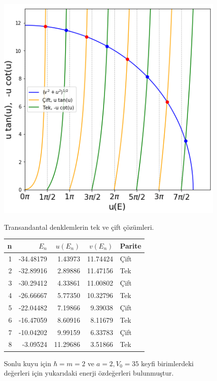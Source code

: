 \documentclass[a4paper,12pt, twoside]{article}
\begin{document}
\begin{figure}[!hbtp]
\begin{minipage}{.5\textwidth}
	\centering
	\includegraphics[width=\linewidth]{figurler/SonluKuyu_transandantal_cozumler.png}
	\caption{Transandantal denklemlerin tek ve çift çözümleri.}
	\label{fig:sonluKuyu_transandantal_cozumler}
\end{minipage}
\begin{minipage}{.5\textwidth}
\begin{tabular}{rrrrl}
\hline
	n & $E_n$     &   $u(E_n)$ &   $v(E_n)$ & Parite\\
\hline
	1 & -34.48179 &    1.43973 &   11.74424 & Çift \\
	2 & -32.89916 &    2.89886 &   11.47156 & Tek \\
	3 & -30.29412 &    4.33861 &   11.00802 & Çift \\
	4 & -26.66667 &    5.77350 &   10.32796 & Tek \\
	5 & -22.04482 &    7.19866 &    9.39038 & Çift \\
	6 & -16.47059 &    8.60916 &    8.11679 & Tek \\
	7 & -10.04202 &    9.99159 &    6.33783 & Çift \\
	8 &  -3.09524 &   11.29686 &    3.51866 & Tek\\
\hline
\end{tabular}
\caption{Sonlu kuyu için $\hbar = m = 2$ ve $a=2, V_0=35$ keyfi birimlerdeki değerleri için yukarıdaki enerji özdeğerleri bulunmuştur.
\vspace{24pt}
}
\end{minipage}
\end{figure}


\newpage
\renewcommand\refname{Kaynaklar}
{}
 
\end{document}
